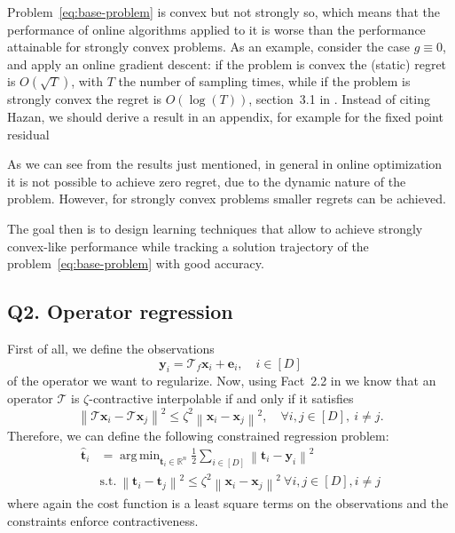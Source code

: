 \documentclass{article}
\DeclareMathOperator*{\argmin}{arg\,min}
\newcommand{\norm}[1]{\left\lVert#1\right\rVert}
\newcommand{\R}{\mathbb{R}}
\newcommand{\e}{\mathbold{e}}
\newcommand{\tv}{\mathbold{t}}
\newcommand{\x}{\mathbold{x}}
\newcommand{\y}{\mathbold{y}}
\newcommand{\T}{\mathcal{T}}
\newcommand{\nicola}[1]{{\color{blue}#1}}
\begin{document}
Problem~\eqref{eq:base-problem} is convex but not strongly so, which means that the performance of online algorithms applied to it is worse than the performance attainable for strongly convex problems. As an example, consider the case $g \equiv 0$, and apply an online gradient descent: if the problem is convex the (static) regret is $O(\sqrt{T})$, with $T$ the number of sampling times, while if the problem is strongly convex the regret is $O(\log(T))$, section~3.1 in \cite{hazan_introduction_2016}. \nicola{Instead of citing Hazan, we should derive a result in an appendix, for example for the fixed point residual}

As we can see from the results just mentioned, in general in online optimization it is not possible to achieve zero regret, due to the dynamic nature of the problem. However, for strongly convex problems smaller regrets can be achieved.

The goal then is to design learning techniques that allow to achieve strongly convex-like performance while tracking a solution trajectory of the problem~\eqref{eq:base-problem} with good accuracy.


\subsection{Q2. Operator regression}
First of all, we define the observations
$$
	\y_i = \T_f \x_i + \e_i, \quad i \in [D]
$$
of the operator we want to regularize. Now, using Fact~2.2 in \cite{ryu_operator_2020} we know that an operator $\T$ is $\zeta$-contractive interpolable if and only if it satisfies
$$
	\norm{\T \x_i - \T \x_j}^2 \leq \zeta^2 \norm{\x_i - \x_j}^2, \quad \forall i,j \in [D], \ i \neq j.
$$
Therefore, we can define the following constrained regression problem:
\begin{equation}\label{eq:operator-regression}
\begin{split}
	\hat{\tv}_i &= \argmin_{\tv_i \in \R^n} \frac{1}{2} \sum_{i \in [D]} \norm{\tv_i - \y_i}^2 \\
	&\text{s.t.} \ \norm{\tv_i - \tv_j}^2 \leq \zeta^2 \norm{\x_i - \x_j}^2 \ \forall i,j \in [D], i \neq j
\end{split}
\end{equation}
where again the cost function is a least square terms on the observations and the constraints enforce contractiveness.
\end{document}
